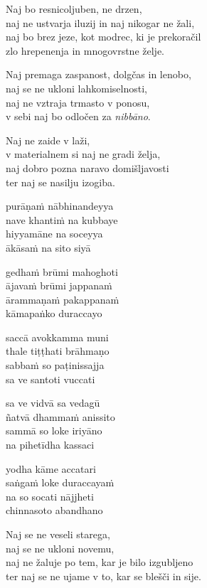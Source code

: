 Naj bo resnicoljuben, ne drzen,\\
naj ne ustvarja iluzij in naj nikogar ne žali,\\
naj bo brez jeze, kot modrec, ki je prekoračil\\
zlo hrepenenja in mnogovrstne želje.

Naj premaga zaspanost, dolgčas in lenobo,\\
naj se ne ukloni lahkomiselnosti,\\
naj ne vztraja trmasto v ponosu,\\
v sebi naj bo odločen za \emph{nibbāno}.

Naj ne zaide v laži,\\
v materialnem si naj ne gradi želja,\\
naj dobro pozna naravo domišljavosti\\
ter naj se nasilju izogiba.


\clearpage

purāṇaṁ nābhinandeyya\\
nave khantiṁ na kubbaye\\
hiyyamāne na soceyya\\
ākāsaṁ na sito siyā

gedhaṁ brūmi mahoghoti\\
ājavaṁ brūmi jappanaṁ\\
ārammaṇaṁ pakappanaṁ\\
kāmapaṅko duraccayo

saccā avokkamma muni\\
thale tiṭṭhati brāhmaṇo\\
sabbaṁ so paṭinissajja\\
sa ve santoti vuccati

sa ve vidvā sa vedagū\\
ñatvā dhammaṁ anissito\\
sammā so loke iriyāno\\
na pihetīdha kassaci

yodha kāme accatari\\
saṅgaṁ loke duraccayaṁ\\
na so socati nājjheti\\
chinnasoto abandhano


\clearpage

Naj se ne veseli starega,\\
naj se ne ukloni novemu,\\
naj ne žaluje po tem, kar je bilo izgubljeno\\
ter naj se ne ujame v to, kar se blešči in sije.

